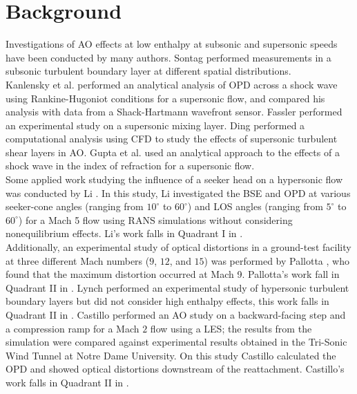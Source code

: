 \section{Background \label{ch1:background}}
    Investigations of \gls{AO} effects at low enthalpy at subsonic and
    supersonic speeds have been conducted by many authors. Sontag
    \cite{Sontag2020} performed measurements in a subsonic turbulent boundary
    layer at different spatial distributions. \\

    Kanlensky et al. \cite{Kalensky2023} performed an analytical analysis of \gls{OPD}
    across a shock wave using Rankine-Hugoniot conditions for a supersonic
    flow, and compared his analysis with data from a Shack-Hartmann wavefront
    sensor. Fassler \cite{Fassler2024} performed an experimental study on a supersonic mixing
    layer. Ding \cite{Ding2024} performed a computational analysis using
    \gls{CFD} to study the effects of supersonic turbulent shear layers in
    \gls{AO}. Gupta et al. \cite{Gupta2020} used an analytical approach to the
        effects of a shock wave in the index of refraction for a supersonic
        flow.  \\

    Some applied
    work studying the influence of a seeker head on a hypersonic flow was
    conducted by Li \cite{Li2023}.  In this study, Li
        investigated the \gls{BSE} and \gls{OPD} 
        at various seeker-cone angles (ranging from $10^{\circ}$ to
        $60^{\circ}$) and \gls{LOS} angles (ranging from $5^{\circ}$
        to $60^{\circ}$) for a Mach 5 flow using \gls{RANS} simulations without considering nonequilibrium
        effects. Li's work falls in Quadrant I in
        . \\

        Additionally, an experimental study of
        optical distortions in a ground-test facility at three different Mach
        numbers ($9$, $12$, and $15$) was performed by Pallotta
        \cite{Pallotta2025}, who found that the maximum distortion occurred at
        Mach 9. Pallotta's work fall in Quadrant II in
        . Lynch \cite{Lynch2022} performed an
        experimental study of hypersonic turbulent boundary layers but did not
        consider high enthalpy effects, this work falls in Quadrant II in
        . Castillo
        \cite{CastilloGomez2023a}
        performed an \gls{AO} study on a backward-facing step and a
        compression ramp for a Mach $2$ flow using a \gls{LES};
        the results from the simulation were compared against experimental
        results obtained in the Tri-Sonic Wind Tunnel at Notre Dame University.
        On this study Castillo calculated the \gls{OPD} and
        showed optical distortions downstream of the reattachment. Castillo's
        work falls in Quadrant II in .\\

